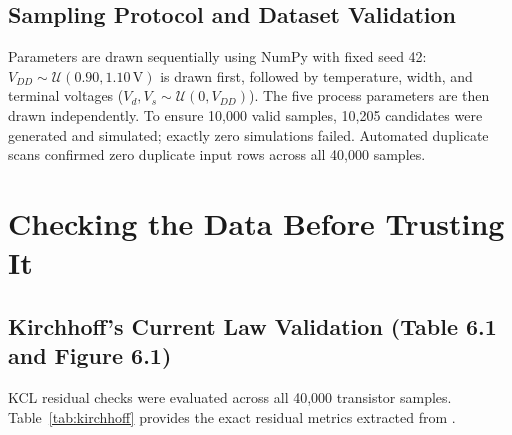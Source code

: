 \documentclass[11pt,a4paper]{article}
\numberwithin{table}{section}
\numberwithin{figure}{section}
\begin{document}
\begin{table}[H]
\centering
\caption{The Four Transistor Operating States}
\label{tab:trans_cases}
\end{table}

\subsection{Sampling Protocol and Dataset Validation}
Parameters are drawn sequentially using NumPy with fixed seed 42: $V_{DD} \sim \mathcal{U}(0.90, 1.10\,\mathrm{V})$ is drawn first, followed by temperature, width, and terminal voltages ($V_d, V_s \sim \mathcal{U}(0, V_{DD})$). The five process parameters are then drawn independently. To ensure 10,000 valid samples, 10,205 candidates were generated and simulated; exactly zero simulations failed. Automated duplicate scans confirmed zero duplicate input rows across all 40,000 samples.

\section{Checking the Data Before Trusting It}
\subsection{Kirchhoff's Current Law Validation (Table 6.1 and Figure 6.1)}
KCL residual checks were evaluated across all 40,000 transistor samples. Table~\ref{tab:kirchhoff} provides the exact residual metrics extracted from .
\end{document}
